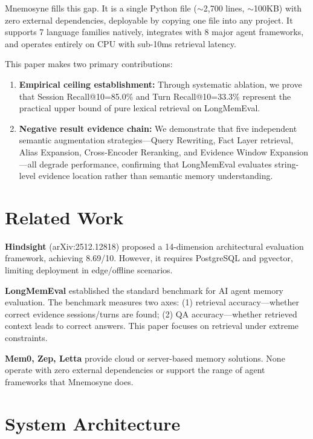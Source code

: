 \documentclass[11pt,a4paper]{article}
\begin{document}
Mnemosyne fills this gap. It is a single Python file ($\sim$2,700 lines, $\sim$100KB) with zero external dependencies, deployable by copying one file into any project. It supports 7 language families natively, integrates with 8 major agent frameworks, and operates entirely on CPU with sub-10ms retrieval latency.

This paper makes two primary contributions:

\begin{enumerate}
    \item \textbf{Empirical ceiling establishment:} Through systematic ablation, we prove that Session Recall@10=85.0\% and Turn Recall@10=33.3\% represent the practical upper bound of pure lexical retrieval on LongMemEval.
    \item \textbf{Negative result evidence chain:} We demonstrate that five independent semantic augmentation strategies---Query Rewriting, Fact Layer retrieval, Alias Expansion, Cross-Encoder Reranking, and Evidence Window Expansion---all degrade performance, confirming that LongMemEval evaluates string-level evidence location rather than semantic memory understanding.
\end{enumerate}

\section{Related Work}

\textbf{Hindsight} (arXiv:2512.12818) proposed a 14-dimension architectural evaluation framework, achieving 8.69/10. However, it requires PostgreSQL and pgvector, limiting deployment in edge/offline scenarios.

\textbf{LongMemEval} established the standard benchmark for AI agent memory evaluation. The benchmark measures two axes: (1) retrieval accuracy---whether correct evidence sessions/turns are found; (2) QA accuracy---whether retrieved context leads to correct answers. This paper focuses on retrieval under extreme constraints.

\textbf{Mem0, Zep, Letta} provide cloud or server-based memory solutions. None operate with zero external dependencies or support the range of agent frameworks that Mnemosyne does.

\section{System Architecture}
\end{document}

